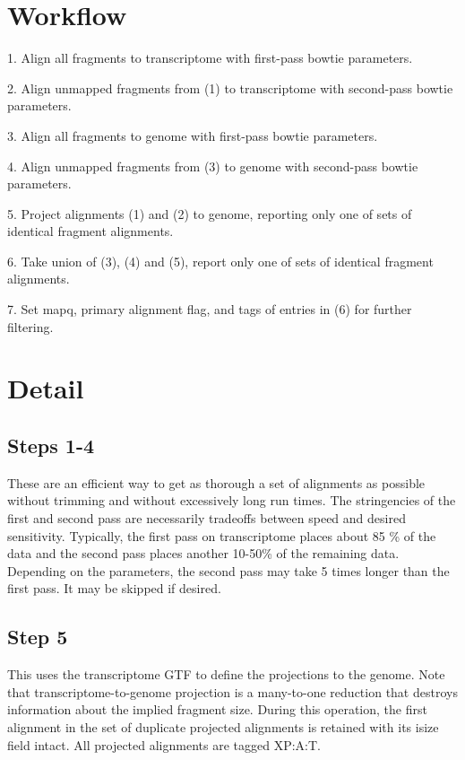 \documentclass[10pt]{article}
\begin{document}
\section*{Workflow}

1. Align all fragments to transcriptome with first-pass bowtie
parameters.

2. Align unmapped fragments from (1) to transcriptome with second-pass
bowtie parameters.

3. Align all fragments to genome with first-pass bowtie parameters.

4. Align unmapped fragments from (3) to genome with second-pass bowtie
parameters.

5. Project alignments (1) and (2) to genome, reporting only one of
sets of identical fragment alignments.

6. Take union of (3), (4) and (5), report only one of sets of
identical fragment alignments.

7. Set mapq, primary alignment flag, and tags of entries in (6) for
further filtering.


\section*{Detail}

\subsection*{Steps 1-4}

These are an efficient way to get as thorough a set of alignments as
possible without trimming and without excessively long run times. The
stringencies of the first and second pass are necessarily tradeoffs
between speed and desired sensitivity. Typically, the first pass on
transcriptome places about 85 \% of the data and the second pass
places another 10-50\% of the remaining data. Depending on the
parameters, the second pass may take 5 times longer than the first
pass. It may be skipped if desired.

\subsection*{Step 5} 

This uses the transcriptome GTF to define the projections to the
genome. Note that transcriptome-to-genome projection is a many-to-one
reduction that destroys information about the implied fragment
size. During this operation, the first alignment in the set of
duplicate projected alignments is retained with its isize field
intact. All projected alignments are tagged XP:A:T.
\end{document}
